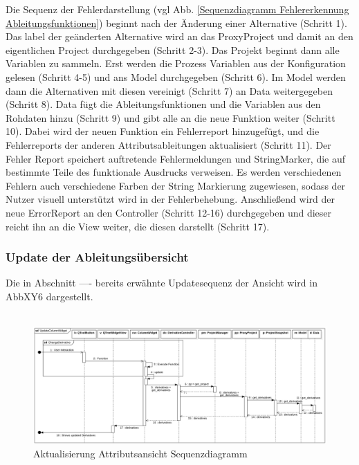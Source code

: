 \documentclass{article}
\begin{document}
Die Sequenz der Fehlerdarstellung (vgl Abb. \ref{Sequenzdiagramm Fehlererkennung Ableitungsfunktionen}) beginnt nach der Änderung einer Alternative (Schritt 1). Das label der geänderten Alternative wird an das ProxyProject und damit an den eigentlichen Project durchgegeben (Schritt 2-3). Das Projekt beginnt dann alle Variablen zu sammeln. Erst werden die Prozess Variablen aus der Konfiguration gelesen (Schritt 4-5) und ans Model durchgegeben (Schritt 6). Im Model werden dann die Alternativen mit diesen vereinigt (Schritt 7) an Data weitergegeben (Schritt 8). Data fügt die Ableitungsfunktionen und die Variablen aus den Rohdaten hinzu (Schritt 9) und gibt alle an die neue Funktion weiter (Schritt 10). Dabei wird der neuen Funktion ein Fehlerreport hinzugefügt, und die Fehlerreports der anderen Attributsableitungen aktualisiert (Schritt 11). Der Fehler Report speichert auftretende Fehlermeldungen und StringMarker, die auf bestimmte Teile des funktionale Ausdrucks verweisen. Es werden verschiedenen Fehlern auch verschiedene Farben der String Markierung zugewiesen, sodass der Nutzer visuell unterstützt wird in der Fehlerbehebung. Anschließend wird der neue ErrorReport an den Controller (Schritt 12-16) durchgegeben und dieser reicht ihn an die View weiter, die diesen darstellt (Schritt 17).

\subsubsection{Update der Ableitungsübersicht}\label{sec: Update der Ableitungsübersicht}
Die in Abschnitt ---- bereits erwähnte Updatesequenz der Ansicht wird in AbbXY6 dargestellt. \\\\

\begin{figure}[H]%
    \centering
    \includegraphics[width=13cm]{entwurf/Floriane/UpdateColumnWidget.png}
    \caption{Aktualisierung Attributsansicht Sequenzdiagramm}
\end{figure}
\end{document}
